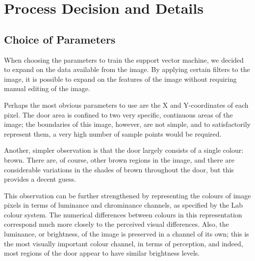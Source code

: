\chapter{Process Decision and Details}

\section{Choice of Parameters}

When choosing the parameters to train the support vector machine, we decided to expand on the data available from the image. By applying certain filters to the image, it is possible to expand on the features of the image without requiring manual editing of the image.

Perhaps the most obvious parameters to use are the X and Y-coordinates of each pixel.  The door area is confined to two very specific, continuous areas of the image; the boundaries of this image, however, are not simple, and to satisfactorily represent them, a very high number of sample points would be required.

Another, simpler observation is that the door largely consists of a single colour: brown.  There are, of course, other brown regions in the image, and there are considerable variations in the shades of brown throughout the door, but this provides a decent guess.  

This observation can be further strengthened by representing the colours of image pixels in terms of luminance and chrominance channels, as specified by the Lab colour system. The numerical differences between colours in this representation correspond much more closely to the perceived visual differences.  Also, the luminance, or brightness, of the image is preserved in a channel of its own; this is the most visually important colour channel, in terms of perception, and indeed, most regions of the door appear to have similar brightness levels.


